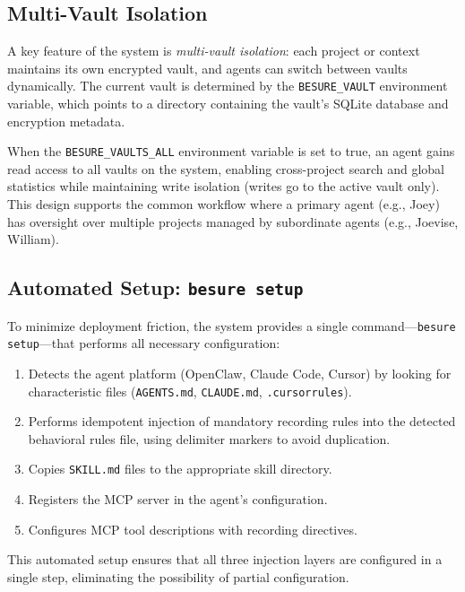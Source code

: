 \documentclass[11pt]{article}
\begin{document}
\subsection{Multi-Vault Isolation}

A key feature of the system is \emph{multi-vault isolation}: each project or context maintains its own encrypted vault, and agents can switch between vaults dynamically. The current vault is determined by the \texttt{BESURE\_VAULT} environment variable, which points to a directory containing the vault's SQLite database and encryption metadata.

When the \texttt{BESURE\_VAULTS\_ALL} environment variable is set to true, an agent gains read access to all vaults on the system, enabling cross-project search and global statistics while maintaining write isolation (writes go to the active vault only). This design supports the common workflow where a primary agent (e.g., Joey) has oversight over multiple projects managed by subordinate agents (e.g., Joevise, William).

\subsection{Automated Setup: \texttt{besure setup}}

To minimize deployment friction, the system provides a single command---\texttt{besure setup}---that performs all necessary configuration:

\begin{enumerate}
    \item Detects the agent platform (OpenClaw, Claude Code, Cursor) by looking for characteristic files (\texttt{AGENTS.md}, \texttt{CLAUDE.md}, \texttt{.cursorrules}).
    \item Performs idempotent injection of mandatory recording rules into the detected behavioral rules file, using delimiter markers to avoid duplication.
    \item Copies \texttt{SKILL.md} files to the appropriate skill directory.
    \item Registers the MCP server in the agent's configuration.
    \item Configures MCP tool descriptions with recording directives.
\end{enumerate}

This automated setup ensures that all three injection layers are configured in a single step, eliminating the possibility of partial configuration.
\end{document}
